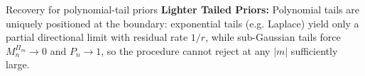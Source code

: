 \documentclass[final]{beamer}
\newcommand{\Leb}{\mathrm{Leb}}
\newcommand{\Lap}{\mathrm{Lap}}
\newlength{\colwidth}
\begin{document}
\begin{frame}[t]
\begin{columns}[t]
\begin{column}{\colwidth}
\begin{alertblock}{Recovery for polynomial-tail priors}
    \textbf{Lighter Tailed Priors:} Polynomial tails are uniquely positioned at the boundary: exponential tails (e.g. Laplace) yield only a partial directional limit with residual rate $1/r$, while sub-Gaussian tails force $M_n^{\Pi_m} \to 0$ and $P_n \to 1$, so the procedure cannot reject at any $|m|$ sufficiently large. 
  \end{alertblock}










\end{column}
\end{columns}
\end{frame}
\end{document}
